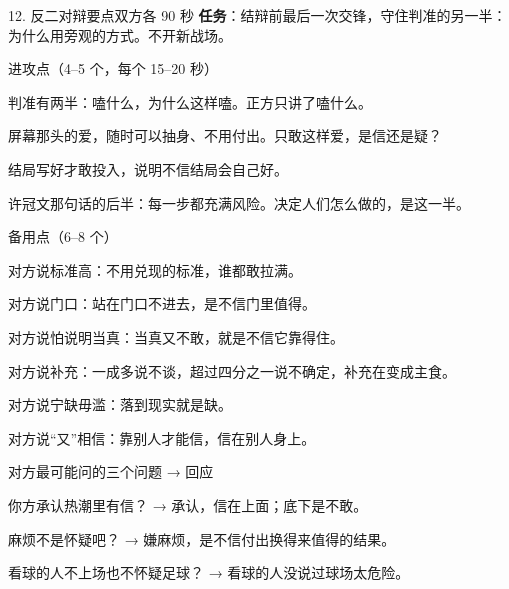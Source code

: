 \documentclass[script,con]{debate}
\begin{document}
\begin{stage}{12. 反二对辩要点}{双方各 90 秒}
\textbf{任务}：结辩前最后一次交锋，守住判准的另一半：为什么用旁观的方式。不开新战场。
\begin{points}{进攻点（4–5 个，每个 15–20 秒）}
\item 判准有两半：嗑什么，为什么这样嗑。正方只讲了嗑什么。
\item 屏幕那头的爱，随时可以抽身、不用付出。只敢这样爱，是信还是疑？
\item 结局写好才敢投入，说明不信结局会自己好。
\item 许冠文那句话的后半：每一步都充满风险。决定人们怎么做的，是这一半。
\end{points}
\begin{points}{备用点（6–8 个）}
\item 对方说标准高：不用兑现的标准，谁都敢拉满。
\item 对方说门口：站在门口不进去，是不信门里值得。
\item 对方说怕说明当真：当真又不敢，就是不信它靠得住。
\item 对方说补充：一成多说不谈，超过四分之一说不确定，补充在变成主食。
\item 对方说宁缺毋滥：落到现实就是缺。
\item 对方说“又”相信：靠别人才能信，信在别人身上。
\end{points}
\begin{points}{对方最可能问的三个问题 → 回应}
\item 你方承认热潮里有信？ → 承认，信在上面；底下是不敢。
\item 麻烦不是怀疑吧？ → 嫌麻烦，是不信付出换得来值得的结果。
\item 看球的人不上场也不怀疑足球？ → 看球的人没说过球场太危险。
\end{points}
\end{stage}
\end{document}

